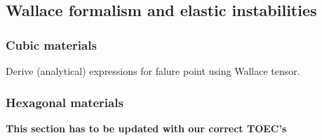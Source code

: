 \documentclass[showpacs,aps,floatfix,prb,reprint,superscriptaddress]{revtex4-1}
\begin{document}




\subsection{Wallace formalism and elastic instabilities}
\subsubsection{Cubic materials}
Derive (analytical) expressions for falure point using Wallace tensor.

\subsubsection{Hexagonal materials}
\textbf{This section has to be updated with our correct TOEC's}
\end{document}
